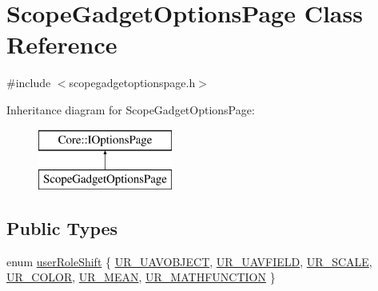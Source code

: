 \hypertarget{class_scope_gadget_options_page}{\section{\-Scope\-Gadget\-Options\-Page \-Class \-Reference}
\label{class_scope_gadget_options_page}
}


{\ttfamily \#include $<$scopegadgetoptionspage.\-h$>$}

\-Inheritance diagram for \-Scope\-Gadget\-Options\-Page\-:\begin{figure}[H]
\begin{center}
\leavevmode
\includegraphics[height=2.000000cm]{class_scope_gadget_options_page}
\end{center}
\end{figure}
\subsection*{\-Public \-Types}
\begin{DoxyCompactItemize}
\item 
enum \hyperlink{group___scope_plugin_gabc55f54668fc1565f24893b44bc2affe}{user\-Role\-Shift} \{ \*
\hyperlink{group___scope_plugin_ggabc55f54668fc1565f24893b44bc2affea1ca47671f95b0080d7fec89b625ecdae}{\-U\-R\-\_\-\-U\-A\-V\-O\-B\-J\-E\-C\-T}, 
\hyperlink{group___scope_plugin_ggabc55f54668fc1565f24893b44bc2affea9d7b3ed8977c973cd47ec9c590888e83}{\-U\-R\-\_\-\-U\-A\-V\-F\-I\-E\-L\-D}, 
\hyperlink{group___scope_plugin_ggabc55f54668fc1565f24893b44bc2affeacf5de4c7658c11db0a432311ce7e302e}{\-U\-R\-\_\-\-S\-C\-A\-L\-E}, 
\hyperlink{group___scope_plugin_ggabc55f54668fc1565f24893b44bc2affea9314bed2c7220cb80e1c7e1c643e7af8}{\-U\-R\-\_\-\-C\-O\-L\-O\-R}, 
\*
\hyperlink{group___scope_plugin_ggabc55f54668fc1565f24893b44bc2affea43e3a9f89e27568aa426874ed469620a}{\-U\-R\-\_\-\-M\-E\-A\-N}, 
\hyperlink{group___scope_plugin_ggabc55f54668fc1565f24893b44bc2affeab9a9633c8bc6a72c30f2a2962ff1e882}{\-U\-R\-\_\-\-M\-A\-T\-H\-F\-U\-N\-C\-T\-I\-O\-N}
 \}
\end{DoxyCompactItemize}
